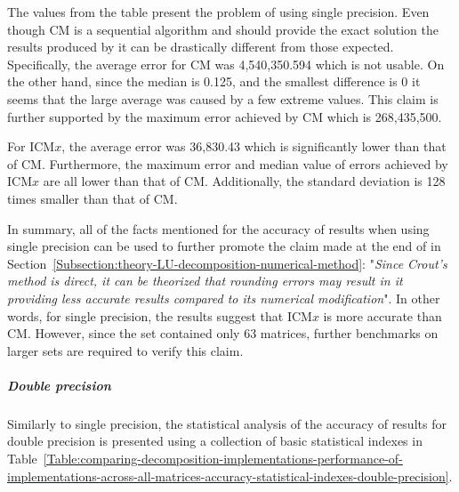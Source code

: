 The values from the table present the problem of using single precision. Even though CM is a sequential algorithm and should provide the exact solution the results produced by it can be drastically different from those expected. Specifically, the average error for CM was 4,540,350.594 which is not usable. On the other hand, since the median is 0.125, and the smallest difference is 0 it seems that the large average was caused by a few extreme values. This claim is further supported by the maximum error achieved by CM which is 268,435,500.
\par For ICM$ x $, the average error was 36,830.43 which is significantly lower than that of CM. Furthermore, the maximum error and median value of errors achieved by ICM$ x $ are all lower than that of CM. Additionally, the standard deviation is 128 times smaller than that of CM.
\par In summary, all of the facts mentioned for the accuracy of results when using single precision can be used to further promote the claim made at the end of \textit{} in Section~\ref{Subsection:theory-LU-decomposition-numerical-method}: "\textit{Since Crout's method is direct, it can be theorized that rounding errors may result in it providing less accurate results compared to its numerical modification}". In other words, for single precision, the results suggest that ICM$ x $ is more accurate than CM. However, since the set contained only 63 matrices, further benchmarks on larger sets are required to verify this claim.

\subparagraph{Double precision} Similarly to single precision, the statistical analysis of the accuracy of results for double precision is presented using a collection of basic statistical indexes in Table~\ref{Table:comparing-decomposition-implementations-performance-of-implementations-across-all-matrices-accuracy-statistical-indexes-double-precision}.

